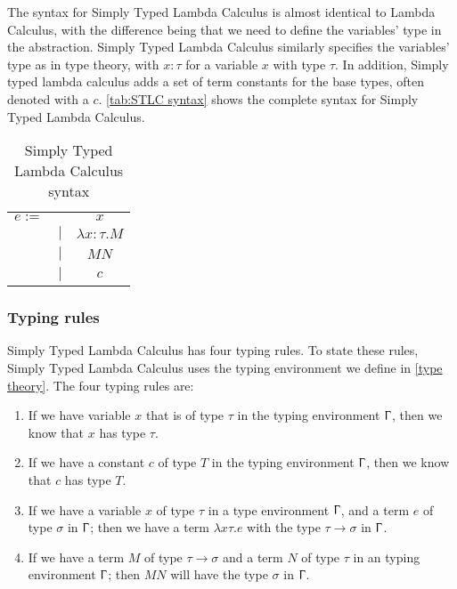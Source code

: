 \para
The syntax for Simply Typed Lambda Calculus is almost identical to Lambda Calculus, with the difference being that we need to define the variables' type in the abstraction. Simply Typed Lambda Calculus similarly specifies the variables' type as in type theory, with $x:\tau$ for a variable $x$ with type $\tau$. In addition, Simply typed lambda calculus adds a set of term constants for the base types, often denoted with a $c$. \autoref{tab:STLC syntax} shows the complete syntax for Simply Typed Lambda Calculus.


\begin{table}[]
    \centering
    \begin{tabular}{c c c}
         $e :=$&  & $x$\\
         & $|$ & $\lambda x:\tau.M$ \\
         & $|$ &  $M N$ \\
         & $|$ &  $c$ \\
    \end{tabular}
    \caption{Simply Typed Lambda Calculus syntax}
    \label{tab:STLC syntax}
\end{table}

\subsubsection{Typing rules}
Simply Typed Lambda Calculus has four typing rules. To state these rules, Simply Typed Lambda Calculus uses the typing environment we define in \autoref{type theory}. The four typing rules are:

\begin{enumerate}
    \item If we have variable $x$ that is of type $\tau$ in the typing environment $\Upgamma$, then we know that $x$ has type $\tau$.
    \item If we have a constant $c$ of type $T$ in the typing environment $\Upgamma$, then we know that $c$ has type $T$.
    \item If we have a variable $x$ of type $\tau$ in a type environment $\Upgamma$, and a term $e$ of type $\sigma$ in $\Upgamma$; then we have a term $\lambda x\tau .e$ with the type $\tau \rightarrow \sigma$ in $\Upgamma$.
    \item If we have a term $M$ of type $\tau \rightarrow \sigma$ and a term $N$ of type $\tau$ in an typing environment $\Upgamma$; then $M N$ will have the type $\sigma$ in $\Upgamma$.
\end{enumerate}

